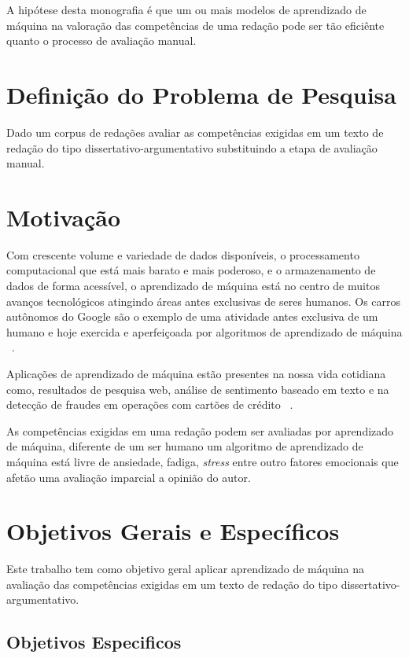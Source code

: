 A hipótese desta monografia é que um ou mais modelos de aprendizado de máquina na valoração das competências de uma redação pode ser tão eficiênte quanto o processo de avaliação manual.

\section{Definição do Problema de Pesquisa}

Dado um corpus de redações avaliar as competências exigidas em um texto de redação do tipo dissertativo-argumentativo substituindo a etapa de avaliação manual.

\section{Motivação}

Com crescente volume e variedade de dados disponíveis, o processamento computacional que está mais barato e mais poderoso, e o armazenamento de dados de forma acessível, o aprendizado de máquina está no centro de muitos avanços tecnológicos atingindo áreas antes exclusivas de seres humanos. Os carros autônomos do Google são o exemplo de uma atividade antes exclusiva de um humano e hoje exercida e aperfeiçoada por algoritmos de aprendizado de máquina ~\cite{waymo:2017}.

Aplicações de aprendizado de máquina estão presentes na nossa vida cotidiana como, resultados de pesquisa web, análise de sentimento baseado em texto e na detecção de fraudes em operações com cartões de crédito ~\cite{batista1999aplicando}.

As competências exigidas em uma redação podem ser avaliadas por aprendizado de máquina, diferente de um ser humano um algoritmo de aprendizado de máquina está livre de ansiedade, fadiga, \textit{stress} entre outro fatores emocionais que afetão uma avaliação imparcial a opinião do autor.

\section{Objetivos Gerais e Específicos}

Este trabalho tem como objetivo geral aplicar aprendizado de máquina na avaliação das competências exigidas em um texto de redação do tipo dissertativo-argumentativo.

\subsection{Objetivos Especificos}

